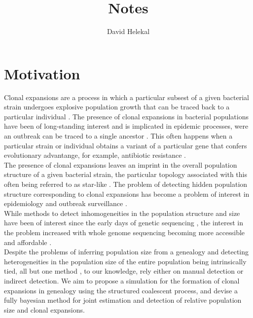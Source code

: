 \documentclass{report}
\title{Notes}
\author{David Helekal}
\theoremstyle{definition}
\begin{document}
\maketitle
\newpage
\tableofcontents
\newpage
\chapter{Motivation}
Clonal expansions are a process in which a particular subsest of a given bacterial strain undergoes explosive population growth that can be traced back to a particular individual \cite{smith_how_1993}. The presence of clonal expansions in bacterial populations have been of long-standing interest and is implicated in epidemic processes, were an outbreak can be traced to a single ancestor \cite{smith_how_1993,spratt_displaying_2004,fraser_neutral_2005,ledda_re-emergence_2017}. This often happens when a particular strain or individual obtains a variant of a particular gene that confers evolutionary advantange, for example, antibiotic resistance \cite{holden_genomic_2013,hsu_evolutionary_2015, ledda_re-emergence_2017}.\\
The presence of clonal expansions leaves an imprint in the overall population structure of a given bacterial strain, the particular topology associated with this often being referred to as star-like \cite{smith_how_1993,spratt_displaying_2004}.
The problem of detecting hidden population structure corresponding to clonal expansions has become a problem of interest in epidemiology and outbreak surveillance \cite{volz_identification_nodate}.\\
While methods to detect inhomogeneities in the population structure and size have been of interest since the early days of genetic sequencing \cite{smith_how_1993,spratt_displaying_2004}, the interest in the problem increased with whole genome sequencing becoming more accessible and affordable \cite{holden_genomic_2013,dearlove_measuring_2015,eldholm_four_2015}.\\
Despite the problems of inferring population size from a genealogy and detecting heterogeneities in the population size of the entire population being intrinsically tied, all but one method \cite{volz_identification_nodate}, to our knowledge, rely either on manual detection or indirect detection. We aim to propose a simulation for the formation of clonal expansions in genealogy using the structured coalescent process, and devise a fully bayesian method for joint estimation and detection of relative population size and clonal expansions.
\end{document}
